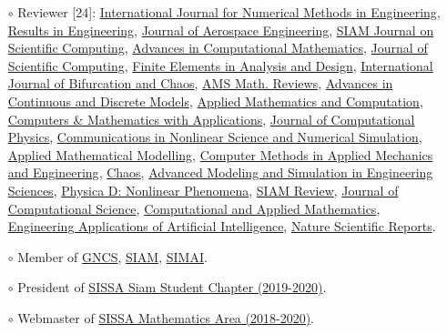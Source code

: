 \documentclass[
  usegeometry%
]{scrartcl}
\begin{document}
\begin{cv}{}
{\begin{itemize}
    \item[$\circ$] Reviewer [24]: \href{https://onlinelibrary.wiley.com/journal/10970207}{ International Journal for Numerical Methods in Engineering}, \href{https://www.sciencedirect.com/journal/results-in-engineering}{Results in Engineering}, \href{https://ascelibrary.org/journal/jaeeez}{Journal of Aerospace Engineering}, \href{https://sisc.siam.org}{SIAM Journal on Scientific Computing}, \href{https://www.springer.com/journal/10444}{Advances in Computational Mathematics}, \href{https://www.springer.com/journal/10915}{Journal of Scientific Computing}, \href{https://www.sciencedirect.com/journal/finite-elements-in-analysis-and-design}{Finite Elements in Analysis and Design}, \href{https://www.worldscientific.com/worldscinet/ijbc}{International Journal of Bifurcation and Chaos}, \href{http://www.ams.org/publications/math-reviews/math-reviews}{AMS Math. Reviews}, \href{https://advancesindifferenceequations.springeropen.com}{Advances in Continuous and Discrete Models}, \href{https://www.sciencedirect.com/journal/applied-mathematics-and-computation}{Applied Mathematics and Computation}, \href{https://www.sciencedirect.com/journal/computers-and-mathematics-with-applications}{Computers \& Mathematics with Applications}, \href{https://www.sciencedirect.com/journal/journal-of-computational-physics}{Journal of Computational Physics}, \href{https://www.sciencedirect.com/journal/communications-in-nonlinear-science-and-numerical-simulation}{Communications in Nonlinear Science and Numerical Simulation}, \href{https://www.sciencedirect.com/journal/applied-mathematical-modelling}{Applied Mathematical Modelling}, \href{https://www.sciencedirect.com/journal/computer-methods-in-applied-mechanics-and-engineering}{Computer Methods in Applied Mechanics and Engineering}, \href{https://pubs.aip.org/aip/cha}{Chaos}, \href{https://amses-journal.springeropen.com}{Advanced Modeling and Simulation in Engineering Sciences}, \href{https://www.sciencedirect.com/journal/physica-d-nonlinear-phenomena}{Physica D: Nonlinear Phenomena}, \href{https://epubs.siam.org/journal/sirev}{SIAM Review}, \href{https://www.sciencedirect.com/journal/journal-of-computational-science}{Journal of Computational Science}, \href{https://link.springer.com/journal/40314}{Computational and Applied Mathematics}, \href{https://www.sciencedirect.com/journal/engineering-applications-of-artificial-intelligence}{Engineering Applications of Artificial Intelligence}, \href{https://www.nature.com/srep}{Nature Scientific Reports}.
    \item[$\circ$] Member of \href{https://www.altamatematica.it/gncs/}{GNCS}, \href{https://www.siam.org}{SIAM}, \href{https://www.simai.eu}{SIMAI}.
    \item[$\circ$] President of \href{http://www.math.sissa.it/content/sissa-siam-student-chapter}{SISSA Siam Student Chapter (2019-2020)}.
    \item[$\circ$] Webmaster of \href{https://www.math.sissa.it/content/mathematical-analysis-modelling-and-applications-0}{SISSA Mathematics Area (2018-2020)}.
\end{itemize}}


\end{cv}
\end{document}
